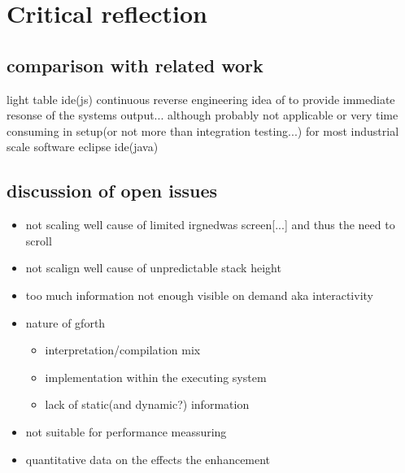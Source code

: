 \chapter{Critical reflection}

\section{comparison with related work}

light table ide(js) continuous reverse engineering idea of \cite{Muller:2000:RER:336512.336526} to provide immediate resonse of the systems output... although probably not applicable or very time consuming in setup(or not more than integration testing...) for most industrial scale software
eclipse ide(java)

\section{discussion of open issues}

\begin{itemize}
\item not scaling well cause of limited irgnedwas screen[...] and thus the need to scroll
\item not scalign well cause of unpredictable stack height
\item too much information not enough visible on demand aka interactivity
\item nature of gforth
\begin{itemize}
\item interpretation/compilation mix
\item implementation within the executing system
\item lack of static(and dynamic?) information
\end{itemize}
\item not suitable for performance meassuring
\item quantitative data on the effects the enhancement
\end{itemize}
